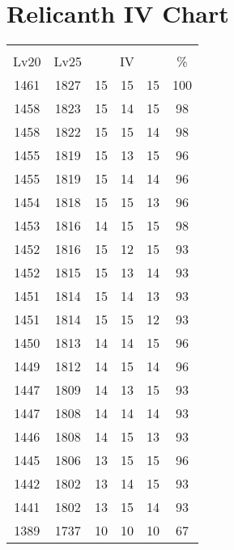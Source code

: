 \documentclass{article}%
\begin{document}
%
\normalsize%
\section{Relicanth IV Chart}%
\label{sec:Relicanth IV Chart}%
\renewcommand{\arraystretch}{1.5}%
\begin{tabular}{|c|c|c|c|c|c|}%
\hline%
\multicolumn{6}{|c|}{\textcolor{white}{ 
\linebreak{Relicanth}
}%
\cellcolor{black}}\\%
\multicolumn{1}{|c}{Lv20}&\multicolumn{1}{c|}{Lv25}&\multicolumn{3}{c|}{IV}&\multicolumn{1}{|c|}{\%}\\%
\hline%
\rowcolor{color100}%
1461&1827&15&15&15&100\\%
\hline%
\rowcolor{color98}%
1458&1823&15&14&15&98\\%
\hline%
\rowcolor{color98}%
1458&1822&15&15&14&98\\%
\hline%
\rowcolor{color96}%
1455&1819&15&13&15&96\\%
\hline%
\rowcolor{color96}%
1455&1819&15&14&14&96\\%
\hline%
\rowcolor{color96}%
1454&1818&15&15&13&96\\%
\hline%
\rowcolor{color98}%
1453&1816&14&15&15&98\\%
\hline%
\rowcolor{color93}%
1452&1816&15&12&15&93\\%
\hline%
\rowcolor{color93}%
1452&1815&15&13&14&93\\%
\hline%
\rowcolor{color93}%
1451&1814&15&14&13&93\\%
\hline%
\rowcolor{color93}%
1451&1814&15&15&12&93\\%
\hline%
\rowcolor{color96}%
1450&1813&14&14&15&96\\%
\hline%
\rowcolor{color96}%
1449&1812&14&15&14&96\\%
\hline%
\rowcolor{color93}%
1447&1809&14&13&15&93\\%
\hline%
\rowcolor{color93}%
1447&1808&14&14&14&93\\%
\hline%
\rowcolor{color93}%
1446&1808&14&15&13&93\\%
\hline%
\rowcolor{color96}%
1445&1806&13&15&15&96\\%
\hline%
\rowcolor{color93}%
1442&1802&13&14&15&93\\%
\hline%
\rowcolor{color93}%
1441&1802&13&15&14&93\\%
\hline%
\rowcolor{color91}%
1389&1737&10&10&10&67\\%
\end{tabular}

%
\end{document}
